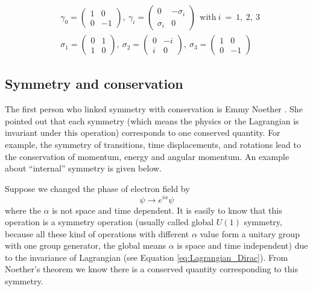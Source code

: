\begin{equation}
\begin{split}
&\gamma_0=\begin{pmatrix} 1 & 0 \\ 0 & -1 \end{pmatrix},~
\gamma_i=\begin{pmatrix} 0 & -\sigma_i \\ \sigma_i & 0 \end{pmatrix} ~~\mathrm{with}~i~=~1,~2,~3\\
&\sigma_1=\begin{pmatrix} 0 & 1 \\ 1 & 0 \end{pmatrix},~\sigma_2=\begin{pmatrix} 0 & -i \\ i & 0 \end{pmatrix},~\sigma_3=\begin{pmatrix} 1 & 0 \\ 0 & -1 \end{pmatrix}
\end{split}
\label{eq:gamma_mu}
\end{equation}

\subsection{Symmetry and conservation}\label{subsec:Sym_con}

The first person who linked symmetry with conservation is Emmy Noether \cite{Noether_Emmy}. She pointed out that each symmetry (which means the physics or the Lagrangian is invariant under this operation) corresponds to one conserved quantity. For example, the symmetry of transitions, time displacements, and rotations lead to the conservation of momentum, energy and angular momentum. An example about ``internal'' symmetry is given below.

Suppose we changed the phase of electron field by
\begin{equation}
\psi\rightarrow e^{i\alpha}\psi
\label{eq:global_phase}
\end{equation}
where the $\alpha$ is not space and time dependent. It is easily to know that this operation is a symmetry operation (usually called global $U(1)$ symmetry, because all these kind of operations with different $\alpha$ value form a unitary group with one group generator, the global means $\alpha$ is space and time independent) due to the invariance of Lagrangian (see Equation \ref{eq:Lagrangian_Dirac}). From Noether's theorem we know there is a conserved quantity corresponding to this symmetry.

